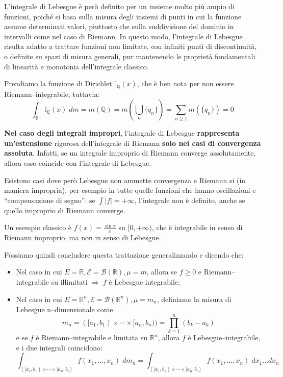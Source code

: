\medskip
L'integrale di Lebesgue è però definito per un insieme molto più ampio di funzioni, poiché si basa sulla misura degli insiemi di punti in cui la funzione assume determinati valori, piuttosto che sulla suddivisione del dominio in intervalli come nel caso di Riemann. In questo modo, l'integrale di Lebesgue risulta adatto a trattare funzioni non limitate, con infiniti punti di discontinuità, o definite su spazi di misura generali, pur mantenendo le proprietà fondamentali di linearità e monotonia dell'integrale classico.

\begin{esempio}
    Prendiamo la funzione di Dirichlet $\mathbb{I}_{\mathbb{Q}}(x)$, che è ben nota per non essere Riemann--integrabile, tuttavia:
    \[\int_\mathbb{R} \mathbb{I}_{\mathbb{Q}}(x) \; dm = m(\mathbb{Q}) = m\left(\bigcup_n \{q_n\}\right) = \sum_{n\geq1}m(\{q_n\}) = 0\]
\end{esempio}

\bigskip
\noindent \textbf{Nel caso degli integrali impropri}, l'integrale di Lebesgue \textbf{rappresenta un'estensione} rigorosa dell'integrale di Riemann \textbf{solo nei casi di convergenza assoluta}. Infatti, se un integrale improprio di Riemann converge assolutamente, allora esso coincide con l'integrale di Lebesgue.

\medskip
\noindent Esistono casi dove però Lebesgue non ammette convergenza e Riemann si (in maniera impropria), per esempio in tutte quelle funzioni che hanno oscillazioni e ``compensazione di segno'': se $\int |f| = +\infty$, l'integrale non è definito, anche se quello improprio di Riemann converge. 

\begin{esempio}
    Un esempio classico è $f(x) = \tfrac{\sin x}{x}$ su $[0,+\infty)$, che è integrabile in senso di Riemann improprio, ma non in senso di Lebesgue.
    \label{leb_ndim}
\end{esempio}

\bigskip
\noindent Possiamo quindi concludere questa trattazione generalizzando e dicendo che:
\begin{itemize}
    \item Nel caso in cui $E = \mathbb{R}, \mathcal{E} = \mathcal{B}(\mathbb{R}), \mu = m$, allora se $f\geq0$ e Riemann--integrabile su illimitati $\Rightarrow\; f$ è Lebesgue integrabile;

    \item Nel caso in cui $E = \mathbb{R}^n, \mathcal{E} = \mathcal{B}(\mathbb{R}^n), \mu = m_n$, definiamo la misura di Lebesgue n--dimensionale come
    \[m_n = ([a_1, b_1)\times\cdots\times[a_n, b_n)) = \prod_{k=1}^n(b_k-a_k)\]
    e se $f$ è Riemann--integrabile e limitata su $\mathbb{R}^n$, allora $f$ è Lebesgue--integrabile, e i due integrali coincidono:
    \[\int_{([a_1, b_1)\times\cdots\times[a_n, b_n)}f(x_1, ..., x_n)\;dm_n = \int_{([a_1, b_1)\times\cdots\times[a_n, b_n)}f(x_1, ..., x_n)\;dx_1...dx_n\]
\end{itemize}

